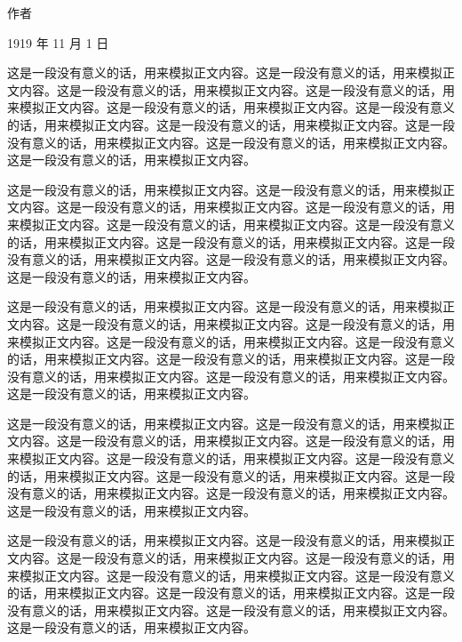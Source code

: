 \closing{作者}{1919 年 11 月 1 日}



这是一段没有意义的话，用来模拟正文内容。这是一段没有意义的话，用来模拟正文内容。这是一段没有意义的话，用来模拟正文内容。这是一段没有意义的话，用来模拟正文内容。这是一段没有意义的话，用来模拟正文内容。这是一段没有意义的话，用来模拟正文内容。这是一段没有意义的话，用来模拟正文内容。这是一段没有意义的话，用来模拟正文内容。这是一段没有意义的话，用来模拟正文内容。这是一段没有意义的话，用来模拟正文内容。

\hr{}

这是一段没有意义的话，用来模拟正文内容。这是一段没有意义的话，用来模拟正文内容。这是一段没有意义的话，用来模拟正文内容。这是一段没有意义的话，用来模拟正文内容。这是一段没有意义的话，用来模拟正文内容。这是一段没有意义的话，用来模拟正文内容。这是一段没有意义的话，用来模拟正文内容。这是一段没有意义的话，用来模拟正文内容。这是一段没有意义的话，用来模拟正文内容。这是一段没有意义的话，用来模拟正文内容。

这是一段没有意义的话，用来模拟正文内容。这是一段没有意义的话，用来模拟正文内容。这是一段没有意义的话，用来模拟正文内容。这是一段没有意义的话，用来模拟正文内容。这是一段没有意义的话，用来模拟正文内容。这是一段没有意义的话，用来模拟正文内容。这是一段没有意义的话，用来模拟正文内容。这是一段没有意义的话，用来模拟正文内容。这是一段没有意义的话，用来模拟正文内容。这是一段没有意义的话，用来模拟正文内容。


这是一段没有意义的话，用来模拟正文内容。这是一段没有意义的话，用来模拟正文内容。这是一段没有意义的话，用来模拟正文内容。这是一段没有意义的话，用来模拟正文内容。这是一段没有意义的话，用来模拟正文内容。这是一段没有意义的话，用来模拟正文内容。这是一段没有意义的话，用来模拟正文内容。这是一段没有意义的话，用来模拟正文内容。这是一段没有意义的话，用来模拟正文内容。这是一段没有意义的话，用来模拟正文内容。


这是一段没有意义的话，用来模拟正文内容。这是一段没有意义的话，用来模拟正文内容。这是一段没有意义的话，用来模拟正文内容。这是一段没有意义的话，用来模拟正文内容。这是一段没有意义的话，用来模拟正文内容。这是一段没有意义的话，用来模拟正文内容。这是一段没有意义的话，用来模拟正文内容。这是一段没有意义的话，用来模拟正文内容。这是一段没有意义的话，用来模拟正文内容。这是一段没有意义的话，用来模拟正文内容。

